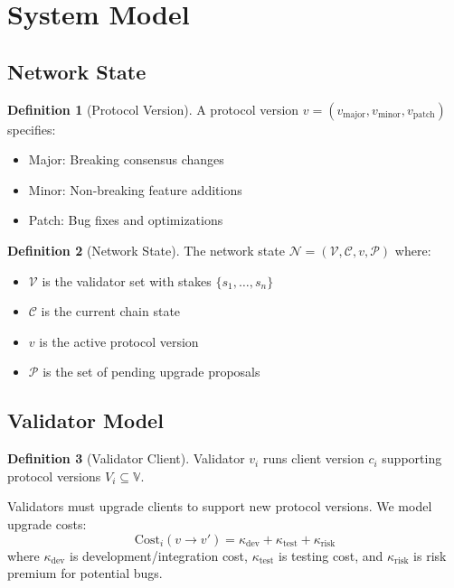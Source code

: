 \documentclass[11pt,a4paper]{article}
\theoremstyle{definition}
\newtheorem{definition}{Definition}[section]
\theoremstyle{remark}
\begin{document}
\section{System Model}

\subsection{Network State}

\begin{definition}[Protocol Version]
A protocol version $v = (v_{\text{major}}, v_{\text{minor}}, v_{\text{patch}})$ specifies:
\begin{itemize}
    \item Major: Breaking consensus changes
    \item Minor: Non-breaking feature additions
    \item Patch: Bug fixes and optimizations
\end{itemize}
\end{definition}

\begin{definition}[Network State]
The network state $\mathcal{N} = (\mathcal{V}, \mathcal{C}, v, \mathcal{P})$ where:
\begin{itemize}
    \item $\mathcal{V}$ is the validator set with stakes $\{s_1, \ldots, s_n\}$
    \item $\mathcal{C}$ is the current chain state
    \item $v$ is the active protocol version
    \item $\mathcal{P}$ is the set of pending upgrade proposals
\end{itemize}
\end{definition}

\subsection{Validator Model}

\begin{definition}[Validator Client]
Validator $v_i$ runs client version $c_i$ supporting protocol versions $V_i \subseteq \mathbb{V}$.
\end{definition}

Validators must upgrade clients to support new protocol versions. We model upgrade costs:
\begin{equation}
    \text{Cost}_i(v \to v') = \kappa_{\text{dev}} + \kappa_{\text{test}} + \kappa_{\text{risk}}
\end{equation}
where $\kappa_{\text{dev}}$ is development/integration cost, $\kappa_{\text{test}}$ is testing cost, and $\kappa_{\text{risk}}$ is risk premium for potential bugs.
\end{document}
